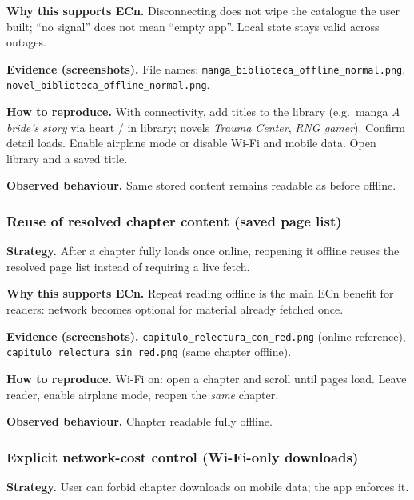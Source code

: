 \textbf{Why this supports ECn.} Disconnecting does not wipe the catalogue the user built; ``no signal'' does not mean ``empty app''. Local state stays valid across outages.

\textbf{Evidence (screenshots).} File names: \texttt{manga\_biblioteca\_offline\_normal.png}, \texttt{novel\_biblioteca\_offline\_normal.png}.


\textbf{How to reproduce.} With connectivity, add titles to the library (e.g.\ manga \emph{A bride's story} via heart / in library; novels \emph{Trauma Center}, \emph{RNG gamer}). Confirm detail loads. Enable airplane mode or disable Wi-Fi and mobile data. Open library and a saved title.

\textbf{Observed behaviour.} Same stored content remains readable as before offline.

\subsubsection{Reuse of resolved chapter content (saved page list)}
\label{sec:ecn-good-cache}
\textbf{Strategy.} After a chapter fully loads once online, reopening it offline reuses the resolved page list instead of requiring a live fetch.

\textbf{Why this supports ECn.} Repeat reading offline is the main ECn benefit for readers: network becomes optional for material already fetched once.

\textbf{Evidence (screenshots).} \texttt{capitulo\_relectura\_con\_red.png} (online reference), \texttt{capitulo\_relectura\_sin\_red.png} (same chapter offline).


\textbf{How to reproduce.} Wi-Fi on: open a chapter and scroll until pages load. Leave reader, enable airplane mode, reopen the \emph{same} chapter.

\textbf{Observed behaviour.} Chapter readable fully offline.

\subsubsection{Explicit network-cost control (Wi-Fi-only downloads)}
\label{sec:ecn-good-wifi}
\textbf{Strategy.} User can forbid chapter downloads on mobile data; the app enforces it.

